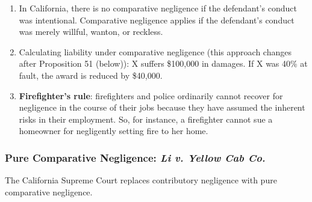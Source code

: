 \begin{enumerate}
    \item In California, there is no comparative negligence if the defendant's 
    conduct was intentional. Comparative negligence applies if the defendant's 
    conduct was merely willful, wanton, or reckless.
    \item Calculating liability under comparative negligence (this approach 
    changes after Proposition 51 (below)): X suffers \$100,000 in damages. If X 
    was 40\% at fault, the award is reduced by \$40,000.
    \item \textbf{Firefighter's rule}: firefighters and police ordinarily 
    cannot recover for negligence in the course of their jobs because they 
    have assumed the inherent risks in their employment. So, for instance, a 
    firefighter cannot sue a homeowner for negligently setting fire to her 
    home.
\end{enumerate}

\subsubsection{Pure Comparative Negligence: \emph{Li v. Yellow Cab Co.}}

The California Supreme Court replaces contributory negligence with pure 
comparative negligence.

